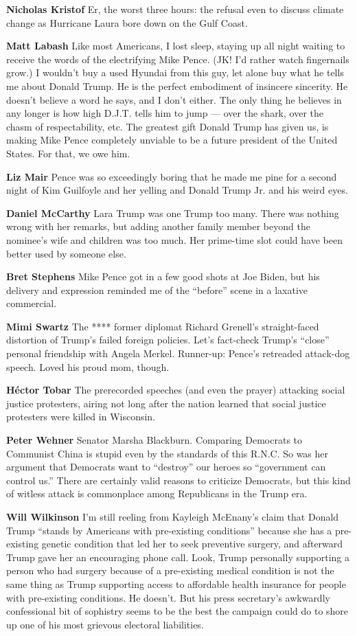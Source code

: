 \textbf{Nicholas Kristof} Er, the worst three hours: the refusal even to
discuss climate change as Hurricane Laura bore down on the Gulf Coast.

\textbf{Matt Labash} Like most Americans, I lost sleep, staying up all
night waiting to receive the words of the electrifying Mike Pence. (JK!
I'd rather watch fingernails grow.) I wouldn't buy a used Hyundai from
this guy, let alone buy what he tells me about Donald Trump. He is the
perfect embodiment of insincere sincerity. He doesn't believe a word he
says, and I don't either. The only thing he believes in any longer is
how high D.J.T. tells him to jump --- over the shark, over the chasm of
respectability, etc. The greatest gift Donald Trump has given us, is
making Mike Pence completely unviable to be a future president of the
United States. For that, we owe him.

\textbf{Liz Mair} Pence was so exceedingly boring that he made me pine
for a second night of Kim Guilfoyle and her yelling and Donald Trump Jr.
and his weird eyes.

\textbf{Daniel McCarthy} Lara Trump was one Trump too many. There was
nothing wrong with her remarks, but adding another family member beyond
the nominee's wife and children was too much. Her prime-time slot could
have been better used by someone else.

\textbf{Bret Stephens} Mike Pence got in a few good shots at Joe Biden,
but his delivery and expression reminded me of the ``before'' scene in a
laxative commercial.

\textbf{Mimi Swartz} The **** former diplomat Richard Grenell's
straight-faced distortion of Trump's failed foreign policies. Let's
fact-check Trump's ``close'' personal friendship with Angela Merkel.
Runner-up: Pence's retreaded attack-dog speech. Loved his proud mom,
though.

\textbf{Héctor Tobar} The prerecorded speeches (and even the prayer)
attacking social justice protesters, airing not long after the nation
learned that social justice protesters were killed in Wisconsin.

\textbf{Peter Wehner} Senator Marsha Blackburn. Comparing Democrats to
Communist China is stupid even by the standards of this R.N.C. So was
her argument that Democrats want to ``destroy'' our heroes so
``government can control us.'' There are certainly valid reasons to
criticize Democrats, but this kind of witless attack is commonplace
among Republicans in the Trump era.

\textbf{Will Wilkinson} I'm still reeling from Kayleigh McEnany's claim
that Donald Trump ``stands by Americans with pre-existing conditions''
because she has a pre-existing genetic condition that led her to seek
preventive surgery, and afterward Trump gave her an encouraging phone
call. Look, Trump personally supporting a person who had surgery because
of a pre-existing medical condition is not the same thing as Trump
supporting access to affordable health insurance for people with
pre-existing conditions. He doesn't. But his press secretary's awkwardly
confessional bit of sophistry seems to be the best the campaign could do
to shore up one of his most grievous electoral liabilities.

